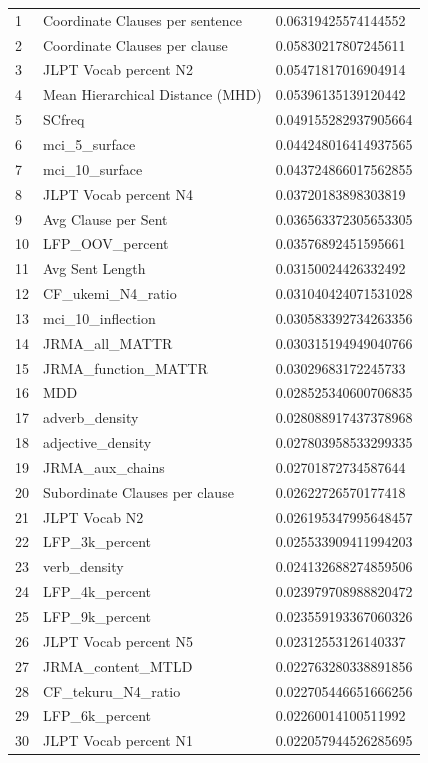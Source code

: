 \begin{longtable}{p{2cm} p{4cm} p{8cm}}
1& Coordinate Clauses per sentence & 0.06319425574144552\\
2& Coordinate Clauses per clause & 0.05830217807245611\\
3& JLPT Vocab percent N2 & 0.05471817016904914\\
4& Mean Hierarchical Distance (MHD) & 0.05396135139120442\\
5& SCfreq& 0.049155282937905664\\
6& mci\_5\_surface& 0.044248016414937565\\
7& mci\_10\_surface& 0.043724866017562855\\
8& JLPT Vocab percent N4& 0.03720183898303819\\
9& Avg Clause per Sent& 0.036563372305653305\\
10& LFP\_OOV\_percent& 0.03576892451595661\\
11& Avg Sent Length& 0.03150024426332492\\
12& CF\_ukemi\_N4\_ratio& 0.031040424071531028\\
13& mci\_10\_inflection& 0.030583392734263356\\
14& JRMA\_all\_MATTR& 0.030315194949040766\\
15& JRMA\_function\_MATTR& 0.03029683172245733\\
16& MDD& 0.028525340600706835\\
17& adverb\_density& 0.028088917437378968\\
18& adjective\_density& 0.027803958533299335\\
19& JRMA\_aux\_chains& 0.02701872734587644\\
20& Subordinate Clauses per clause& 0.02622726570177418\\
21& JLPT Vocab N2& 0.026195347995648457\\
22& LFP\_3k\_percent& 0.025533909411994203\\
23& verb\_density& 0.024132688274859506\\
24& LFP\_4k\_percent& 0.023979708988820472\\
25& LFP\_9k\_percent& 0.023559193367060326\\
26& JLPT Vocab percent N5& 0.02312553126140337\\
27& JRMA\_content\_MTLD& 0.022763280338891856\\
28& CF\_tekuru\_N4\_ratio& 0.022705446651666256\\
29& LFP\_6k\_percent& 0.02260014100511992\\
30& JLPT Vocab percent N1& 0.022057944526285695 \\

\end{longtable}
